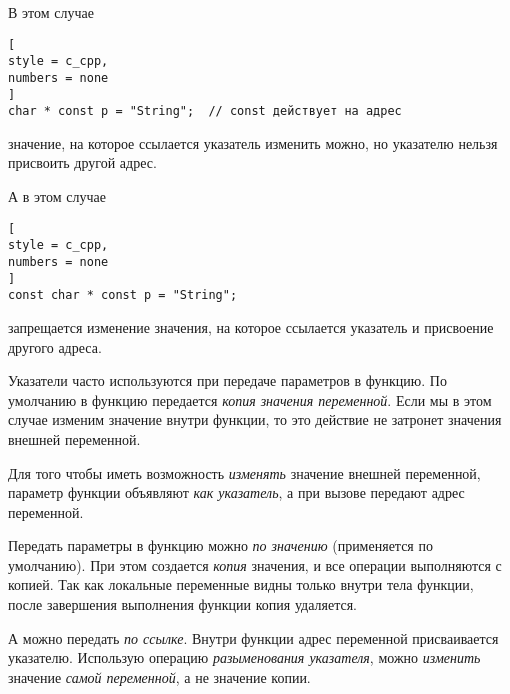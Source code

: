 \documentclass[%
	11pt,
	a4paper,
	utf8,
		]{article}
\begin{document}
В этом случае
\begin{lstlisting}[
style = c_cpp,
numbers = none
]
char * const p = "String";  // const действует на адрес
\end{lstlisting}
значение, на которое ссылается указатель изменить можно, но указателю нельзя присвоить другой адрес.

А в этом случае
\begin{lstlisting}[
style = c_cpp,
numbers = none
]
const char * const p = "String";
\end{lstlisting}
запрещается изменение значения, на которое ссылается указатель и присвоение другого адреса.

Указатели часто используются при передаче параметров в функцию. По умолчанию в функцию передается \emph{копия значения переменной}. Если мы в этом случае изменим значение внутри функции, то это действие не затронет значения внешней переменной.

Для того чтобы иметь возможность \emph{изменять} значение внешней переменной, параметр функции объявляют \emph{как указатель}, а при вызове передают адрес переменной.

Передать параметры в функцию можно \emph{по значению} (применяется по умолчанию). При этом создается \emph{копия} значения, и все операции выполняются с копией. Так как локальные переменные видны только внутри тела функции, после завершения выполнения функции копия удаляется. 

А можно передать \emph{по ссылке}. Внутри функции адрес переменной присваивается указателю. Использую операцию \emph{разыменования указателя}, можно \emph{изменить} значение \emph{самой переменной}, а не значение копии. 








\begin{thebibliography}{99}
	
	
\end{thebibliography}


\lstlistoflistings{}
\end{document}

